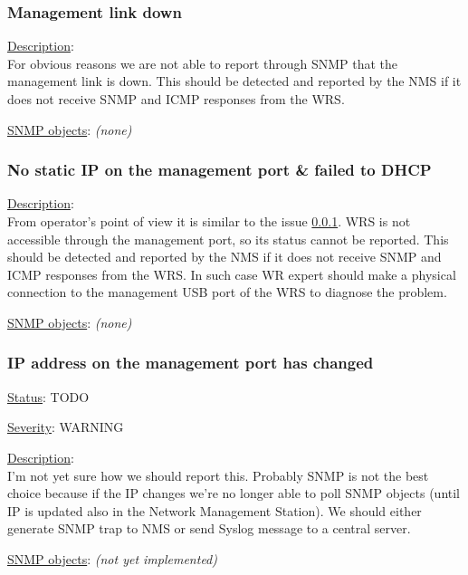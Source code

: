 \subsubsection{\bf Management link down}
		\label{fail:other:management_link}
		\begin{pck_descr}
			\item [] \underline{Description}:\\
				For obvious reasons we are not able to report through SNMP that the
				management link is down. This should be detected and reported by the NMS
				if it does not receive SNMP and ICMP responses from the WRS.
			\item [] \underline{SNMP objects}: \emph{(none)}
		\end{pck_descr}

\subsubsection{\bf No static IP on the management port \& failed to DHCP}
		\begin{pck_descr}
			\item [] \underline{Description}:\\
				From operator's point of view it is similar to the issue
				\ref{fail:other:management_link}. WRS is not accessible through the
				management port, so its status cannot be reported. This should be
				detected and reported by the NMS if it does not receive SNMP and ICMP
				responses from the WRS. In such case WR expert should make a physical
				connection to the management USB port of the WRS to diagnose the
				problem.
			\item [] \underline{SNMP objects}: \emph{(none)}
		\end{pck_descr}

\subsubsection{\bf IP address on the management port has changed}
		\begin{pck_descr}
			\item [] \underline{Status}: TODO
			\item [] \underline{Severity}: WARNING
			\item [] \underline{Description}:\\
				I'm not yet sure how we should report this. Probably SNMP is not the
				best choice because if the IP changes we're no longer able to poll SNMP
				objects (until IP is updated also in the Network Management Station). We
				should either generate SNMP trap to NMS or send Syslog message to a
				central server.
			\item [] \underline{SNMP objects}: \emph{(not yet implemented)}
		\end{pck_descr}

